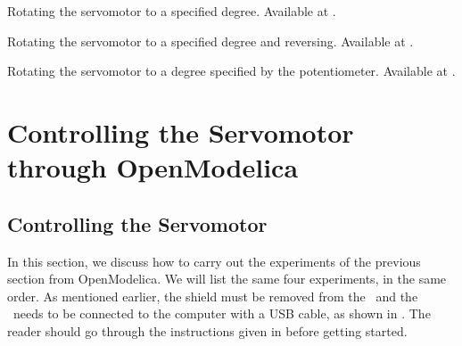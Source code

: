 \begin{juliacode}
   {Rotating
    the servomotor to a specified degree.  Available at
    .}
  \label{julia:servo-init}
  
\end{juliacode}

\begin{juliacode}
   {Rotating
    the servomotor to a specified degree and reversing.  Available at
    .}
  \label{julia:servo-reverse}
  
\end{juliacode}

\begin{juliacode}
  \label{julia:servo-loop}
  
\end{juliacode}

\begin{juliacode}
   {Rotating the servomotor to a degree specified by
    the potentiometer.  Available at .}
  \label{julia:servo-pot}
  
\end{juliacode}

\section{Controlling the Servomotor through OpenModelica}
\subsection{Controlling the Servomotor}
\label{sec:servo-OpenModelica}
In this section, we discuss how to carry out the experiments of the
previous section from OpenModelica.  We will list the same four experiments,
in the same order.  As mentioned earlier, the shield must be removed from 
the \arduino\ and the \arduino\ needs to be connected to the computer 
with a USB cable, as shown in . The reader should go through the instructions given in
 before getting started.

